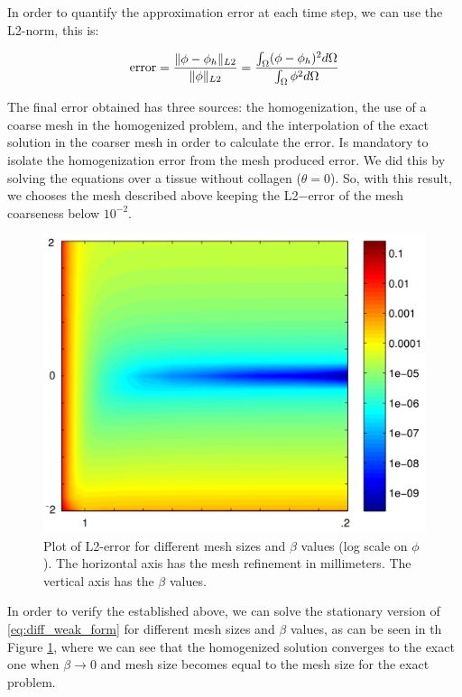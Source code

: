 In order to quantify the approximation error at each time step, we can use the L2-norm, this is:

\begin{equation}
\text{error} = \frac{\lVert\phi - \phi_h\rVert_{L2}}{\lVert\phi\rVert_{L2}} = \frac{\int_{\Omega} (\phi - \phi_h)^2 d\Omega}{\int_{\Omega} \phi^2 d \Omega} \label{eq:errorL2}
\end{equation}

The final error obtained has three sources: the homogenization, the use of a coarse mesh in the homogenized problem, and the interpolation of the exact solution in the coarser mesh in order to calculate the error. Is mandatory to isolate the homogenization error from the mesh produced error. We did this by solving the equations over a tissue without collagen ($\theta = 0$). So, with this result, we chooses the mesh described above keeping the L2$-$error of the mesh coarseness below $10^{-2}$.

\begin{figure}[!htbp]
	\centering
	\includegraphics[height = 4.5 cm]{fig/Verificacion_Teorema/comparison_MEJORAR_SI_ALCANZO}
	\caption{Plot of L2-error for different mesh sizes and $\beta$ values (log scale on $\phi$). The horizontal axis has the mesh refinement in millimeters. The vertical axis has the $\beta$ values.} \label{fig:errorR1}
\end{figure}


In order to verify the established above, we  can solve the stationary version of \eqref{eq:diff_weak_form} for different mesh sizes and $\beta$ values, as can be seen in th Figure \ref{fig:errorR1}, where we can see that the homogenized solution converges to the exact one when $\beta \rightarrow 0$ and mesh size becomes equal to the mesh size for the exact problem.

